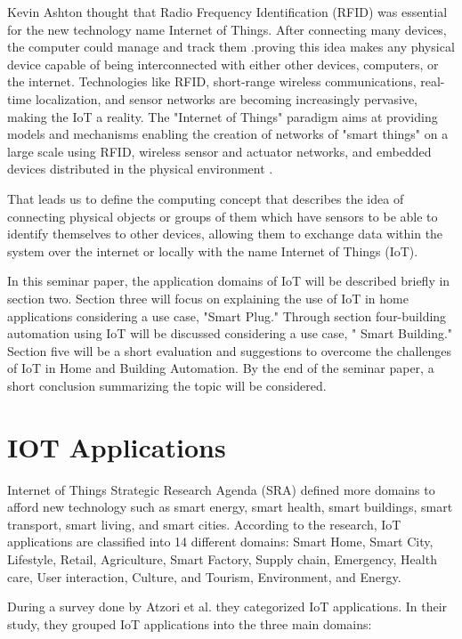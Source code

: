 \documentclass[conference]{IEEEtran}
\begin{document}
Kevin Ashton thought that Radio Frequency Identification (RFID)  was essential for the new technology name Internet of Things.  After connecting many devices, the computer could manage and track them .proving this idea makes any physical device capable of being interconnected with either other devices, computers, or the internet. Technologies like RFID, short-range wireless communications, real-time localization, and sensor networks are becoming increasingly pervasive, making the IoT a reality\cite{discovery}. The "Internet of Things" paradigm aims at providing models and mechanisms enabling the creation of networks of "smart things" on a large scale using RFID, wireless sensor and actuator networks, and embedded devices distributed in the physical environment \cite{RFID}.

That leads us to define the computing concept that describes the idea of connecting physical objects or groups of them which have sensors to be able to identify themselves to other devices, allowing them to exchange data within the system over the internet or locally with the name  Internet of Things (IoT). 

In this seminar paper, the application domains of IoT will be described briefly in section two. Section three will focus on explaining the use of IoT in home applications considering a use case, "Smart Plug." Through section four-building automation using IoT will be discussed considering a use case, " Smart Building." Section five will be a short evaluation and suggestions to overcome the challenges of IoT in Home and Building Automation. By the end of the seminar paper, a short conclusion summarizing the topic will be considered. 

\section{IOT Applications }


Internet of Things Strategic Research Agenda (SRA) \cite{SRA} defined more domains to afford new technology such as smart energy, smart health, smart buildings, smart transport, smart living, and smart cities. According to the research, IoT applications are classified into 14 different domains: Smart Home, Smart City, Lifestyle, Retail, Agriculture, Smart Factory, Supply chain, Emergency, Health care, User interaction, Culture, and Tourism, Environment, and Energy. 


During a survey done by Atzori et al. \cite{azori} they categorized
IoT applications. In their study, they grouped IoT applications   into the  three main domains: 
\end{document}
